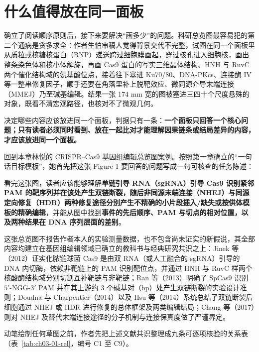 \section{什么值得放在同一面板}

确立了阅读顺序原则后，接下来要解决“画多少”的问题。科研总览图最容易犯的第二个通病是贪多求全：作者生怕审稿人觉得背景交代不完整，试图在同一个面板里从质粒或核糖核蛋白（RNP）递送跨过细胞膜画起，穿过核孔进入细胞核，画出整条染色体和核小体解旋，再画 Cas9 蛋白的写实三维晶体结构、HNH 与 RuvC 两个催化结构域的氨基酸位点，接着往下塞进 Ku70/80、DNA-PKcs、连接酶 IV 等一整串修复因子，顺手还要在角落里补上脱靶效应、微同源介导末端连接（MMEJ）乃至碱基编辑。结果一张 174 mm 宽的图被塞进三四十个尺度悬殊的对象，既看不清宏观路径，也核对不了微观几何。

决定哪些内容应该放进同一个面板，判据只有一条：\textbf{一个面板只回答一个核心问题；只有读者必须同时看到、放在一起比对才能理解因果链条或结局差异的内容，才应该放进同一个面板。}

回到本章林悦的 CRISPR–Cas9 基因组编辑总览图案例。按照第一章确立的“一句话目标模板”，她首先把这张 Figure 1 要回答的问题写成一句可核查的任务陈述：

\begin{BookNote}
看完这张图，读者应该能够理解\textbf{单链引导 RNA（sgRNA）引导 Cas9 识别紧邻 PAM 的靶序列并在该处产生双链断裂，随后非同源末端连接（NHEJ）与同源定向修复（HDR）两种修复途径分别产生不精确的小片段插入/缺失或按供体模板的精确编辑}，并能从图中找到\textbf{事件的先后顺序、PAM 与切点的相对位置，以及两种结果在 DNA 序列层面的差别}。
\end{BookNote}

这张总览图不报告作者本人的实验测量数据，也不包含尚未证实的新假说，其全部内容均建立在基因组编辑领域已确立的教科书与经典研究共识之上：Jinek 等（2012）证实化脓链球菌 Cas9 是由双 RNA（或人工融合的 sgRNA）引导的 DNA 内切酶，依赖非靶链上的 PAM 识别靶位点，并通过 HNH 与 RuvC 样两个核酸酶结构域分别切割互补靶链与非靶链；Ran 等（2013）明确了 SpCas9 识别 $5'$-NGG-$3'$ PAM 并在其上游约 3 个碱基对（bp）处产生双链断裂的实验设计准则；Doudna 与 Charpentier（2014）以及 Hsu 等（2014）系统总结了双链断裂后细胞通过 NHEJ 或 HDR 进行修复的总体框架及两类编辑结局；Chang 等（2017）则对 NHEJ 及替代末端连接途径的分子机制与连接保真度做了严谨界定。

动笔绘制任何草图之前，作者先把上述文献共识整理成九条可逐项核验的关系表（表~\ref{tab:ch03-01-rel}，编号 C1 至 C9）。

